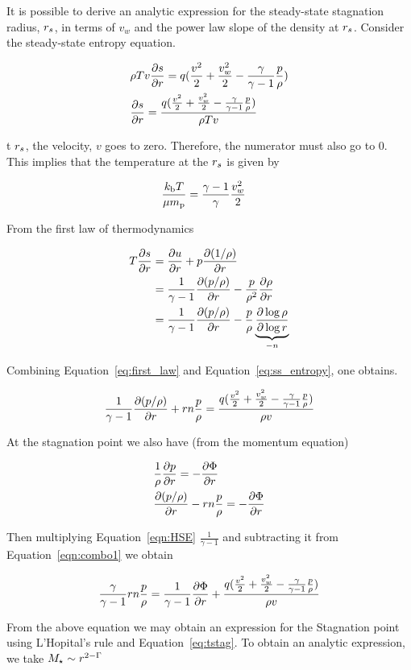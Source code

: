 It is possible to derive an analytic expression for the steady-state stagnation radius, $r_s$, in terms of $v_w$ and the power law slope of the density at $r_s$.  Consider the steady-state entropy equation.

\begin{align}
&\rho T v \frac{\partial s}{\partial r}=q (\frac{v^2}{2}+\frac{v_w^2}{2}-\frac{\gamma}{\gamma-1} \frac{p}{\rho})\\
&\frac{\partial s}{\partial r}=\frac{q (\frac{v^2}{2}+\frac{v_w^2}{2}-\frac{\gamma}{\gamma-1} \frac{p}{\rho})}{\rho T v} \label{eq:ss_entropy}
\end{align}

t $r_s$, the velocity, $v$ goes to zero.  Therefore, the numerator must also go to 0. This implies that the  temperature at the $r_s$ is given by

\begin{align}
 &\frac{k_{\rm b} T}{\mu m_{\rm p}}=\frac{\gamma-1}{\gamma} \frac{v_w^2}{2} 
\end{align}

From the first law of thermodynamics 

\begin{align}
T\frac{\partial s}{\partial r}&=\frac{\partial u}{\partial r}+p\frac{\partial (1/\rho)}{\partial r}\\
&=\frac{1}{\gamma-1}\frac{\partial (p/\rho)}{\partial r}-\frac{p}{\rho^2}\frac{\partial \rho}{\partial r}\\
&=\frac{1}{\gamma-1}\frac{\partial (p/\rho)}{\partial r}-\frac{p}{\rho} \underbrace{\frac{\partial \log{\rho}}{\partial \log{r}}}_{-n} \label{eq:first_law}
\end{align}

Combining Equation~\ref{eq:first_law} and Equation~\ref{eq:ss_entropy}, one obtains.

\begin{align}
\frac{1}{\gamma-1}\frac{\partial (p/\rho)}{\partial r}+r n \frac{p}{\rho}=\frac{q (\frac{v^2}{2}+\frac{v_w^2}{2}-\frac{\gamma}{\gamma-1} \frac{p}{\rho})}{\rho  v} \label{eqn:combo1}
\end{align}

At the stagnation point we also have (from the momentum equation)

\begin{align}
&\frac{1}{\rho}\frac{\partial p}{\partial r}=-\frac{\partial \Phi}{\partial r}\\
&\frac{\partial (p/\rho)}{\partial r}-r n \frac{p}{\rho}=-\frac{\partial \Phi}{\partial r} \label{eqn:HSE}
\end{align}

Then multiplying Equation~\ref{eqn:HSE}  $\frac{1}{\gamma-1}$ and subtracting it from Equation~\ref{eqn:combo1} we obtain

\begin{align}
\frac{\gamma}{\gamma-1} r n \frac{p}{\rho} = \frac{1}{\gamma-1} \frac{\partial \Phi}{\partial r} + \frac{q (\frac{v^2}{2}+\frac{v_w^2}{2}-\frac{\gamma}{\gamma-1} \frac{p}{\rho})}{\rho  v}
\end{align}

From the above equation we may obtain an expression for the Stagnation point using L'Hopital's rule and Equation~\ref{eq:tstag}. To obtain an analytic expression, we take $M_{\star}\sim r^{2-\Gamma}$

